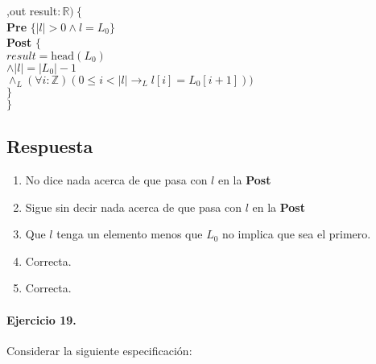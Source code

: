 \documentclass[a4paper]{article}
\begin{document}
\begin{enumerate}[label=\alph*)]
			,out result$:\mathbb{R})\ \{$\smallskip \\
			\hspace*{6mm} \textbf{Pre }$\{ |l|> 0\wedge l=L_0\}$\smallskip \\
			\hspace*{6mm} \textbf{Post }$\{$\\
			\hspace*{6mm} $result=\textrm{head}(L_0)$\\
			\hspace*{6mm} $\wedge |l|=|L_0|-1$\\
			\hspace*{6mm} $\wedge_L (\forall i:\mathbb{Z})(0\leq i < |l|
						\rightarrow_L l[i]=L_0[i+1]))$\\
			\hspace*{6mm}$\}$\\
			$\}$
	\end{enumerate}
\subsection*{Respuesta}
	\begin{enumerate}[label=\alph*)]
		\item No dice nada acerca de que pasa con $l$ en la \textbf{Post}
		\item Sigue sin decir nada acerca de que pasa con $l$ en la \textbf{Post}
		\item Que $l$ tenga un elemento menos que $L_0$ no implica que sea el primero.
		\item Correcta.
		\item Correcta.
	\end{enumerate}

\paragraph*{Ejercicio 19.} Considerar la siguiente especificación:\medskip \\
\end{document}
